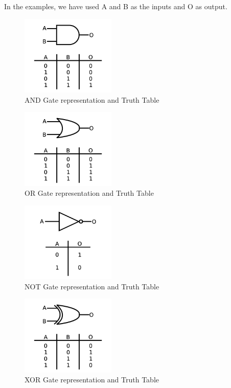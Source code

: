 \documentclass[a4paper,11pt]{report}
\begin{document}
In the examples, we have used A and B as the inputs and O as output.
\begin{figure}[H]
\centering
\includegraphics[width=0.4\textwidth]{andgate1}
\caption{AND Gate representation and Truth Table}
\end{figure}

\begin{figure}[H]
\centering
\includegraphics[width=0.4\textwidth]{orgate1}
\caption{OR Gate representation and Truth Table}
\end{figure}

\begin{figure}[H]
\centering
\includegraphics[width=0.4\textwidth]{notgate1}
\caption{NOT Gate representation and Truth Table}
\end{figure}

\begin{figure}[H]
\centering
\includegraphics[width=0.4\textwidth]{xorgate1}
\caption{XOR Gate representation and Truth Table}
\end{figure}
\end{document}
